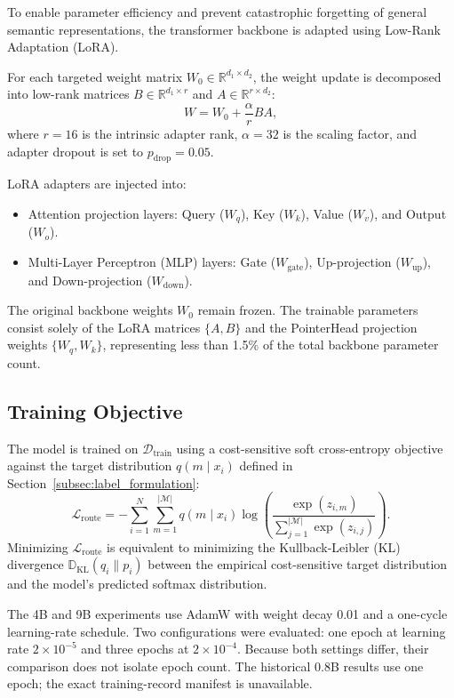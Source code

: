 \documentclass[11pt,a4paper]{article}
\begin{document}
To enable parameter efficiency and prevent catastrophic forgetting of general semantic representations, the transformer backbone is adapted using Low-Rank Adaptation (LoRA).

For each targeted weight matrix $W_0 \in \mathbb{R}^{d_1 \times d_2}$, the weight update is decomposed into low-rank matrices $B \in \mathbb{R}^{d_1 \times r}$ and $A \in \mathbb{R}^{r \times d_2}$:
\begin{equation}
W = W_0 + \frac{\alpha}{r} B A,
\end{equation}
where $r = 16$ is the intrinsic adapter rank, $\alpha = 32$ is the scaling factor, and adapter dropout is set to $p_{\text{drop}} = 0.05$.

LoRA adapters are injected into:
\begin{itemize}
    \item Attention projection layers: Query ($W_q$), Key ($W_k$), Value ($W_v$), and Output ($W_o$).
    \item Multi-Layer Perceptron (MLP) layers: Gate ($W_{\text{gate}}$), Up-projection ($W_{\text{up}}$), and Down-projection ($W_{\text{down}}$).
\end{itemize}
The original backbone weights $W_0$ remain frozen. The trainable parameters consist solely of the LoRA matrices $\{A, B\}$ and the PointerHead projection weights $\{W_q, W_k\}$, representing less than 1.5\% of the total backbone parameter count.

\subsection{Training Objective}
\label{subsec:training_objective}

The model is trained on $\mathcal{D}_{\text{train}}$ using a cost-sensitive soft cross-entropy objective against the target distribution $q(m \mid x_i)$ defined in Section~\ref{subsec:label_formulation}:
\begin{equation}
\mathcal{L}_{\text{route}} = -\sum_{i=1}^{N} \sum_{m=1}^{|\mathcal{M}|} q(m \mid x_i) \log \left( \frac{\exp(z_{i,m})}{\sum_{j=1}^{|\mathcal{M}|} \exp(z_{i,j})} \right).
\end{equation}
Minimizing $\mathcal{L}_{\text{route}}$ is equivalent to minimizing the Kullback-Leibler (KL) divergence $\mathbb{D}_{\text{KL}}(q_i \parallel p_i)$ between the empirical cost-sensitive target distribution and the model's predicted softmax distribution.

The 4B and 9B experiments use AdamW with weight decay 0.01 and a one-cycle learning-rate schedule. Two configurations were evaluated: one epoch at learning rate $2 \times 10^{-5}$ and three epochs at $2 \times 10^{-4}$. Because both settings differ, their comparison does not isolate epoch count. The historical 0.8B results use one epoch; the exact training-record manifest is unavailable.
\end{document}

